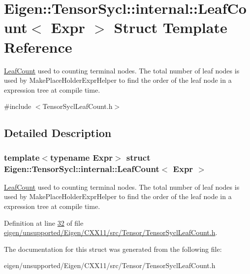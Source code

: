 \hypertarget{struct_eigen_1_1_tensor_sycl_1_1internal_1_1_leaf_count}{}\section{Eigen\+:\+:Tensor\+Sycl\+:\+:internal\+:\+:Leaf\+Count$<$ Expr $>$ Struct Template Reference}
\label{struct_eigen_1_1_tensor_sycl_1_1internal_1_1_leaf_count}


\hyperlink{struct_eigen_1_1_tensor_sycl_1_1internal_1_1_leaf_count}{Leaf\+Count} used to counting terminal nodes. The total number of leaf nodes is used by Make\+Place\+Holder\+Expr\+Helper to find the order of the leaf node in a expression tree at compile time.  




{\ttfamily \#include $<$Tensor\+Sycl\+Leaf\+Count.\+h$>$}



\subsection{Detailed Description}
\subsubsection*{template$<$typename Expr$>$\newline
struct Eigen\+::\+Tensor\+Sycl\+::internal\+::\+Leaf\+Count$<$ Expr $>$}

\hyperlink{struct_eigen_1_1_tensor_sycl_1_1internal_1_1_leaf_count}{Leaf\+Count} used to counting terminal nodes. The total number of leaf nodes is used by Make\+Place\+Holder\+Expr\+Helper to find the order of the leaf node in a expression tree at compile time. 

Definition at line \hyperlink{eigen_2unsupported_2_eigen_2_c_x_x11_2src_2_tensor_2_tensor_sycl_leaf_count_8h_source_l00032}{32} of file \hyperlink{eigen_2unsupported_2_eigen_2_c_x_x11_2src_2_tensor_2_tensor_sycl_leaf_count_8h_source}{eigen/unsupported/\+Eigen/\+C\+X\+X11/src/\+Tensor/\+Tensor\+Sycl\+Leaf\+Count.\+h}.



The documentation for this struct was generated from the following file\+:\begin{DoxyCompactItemize}
\item 
eigen/unsupported/\+Eigen/\+C\+X\+X11/src/\+Tensor/\+Tensor\+Sycl\+Leaf\+Count.\+h\end{DoxyCompactItemize}
